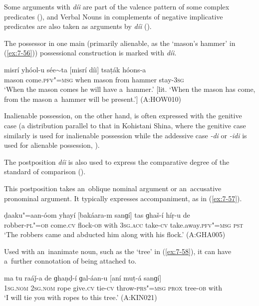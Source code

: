 Some arguments with \textit{díi} are part of the valence pattern of some complex predicates (), and Verbal Nouns in complements of negative implicative predicates are also taken as arguments by \textit{díi} ().


The possessor in one main (primarily alienable, as the `mason's hammer' in (\ref{ex:7-56})) possessional construction is marked with \textit{díi}.

\begin{exe}
\ex
\label{ex:7-56}
\gll misrí yhóol-u sée$\sim$ta [misrí díi] tsaṭák hóons-a \\
mason come.\textsc{pfv"=msg} when mason from hammer stay-\textsc{3sg} \\
\glt `When the mason comes he will have a~hammer.' [lit. `When the mason has come, from the mason a~hammer will be present.'] (A:HOW010)
\end{exe}

Inalienable possession, on the other hand, is often expressed with the genitive case (a distribution parallel to that in Kohistani Shina, where the genitive case similarly is used for inalienable possession while the addessive case \textit{-di} or \textit{-idi} is used for alienable possession, \citealt[65, 69--70]{schmidtkohistani2008}).



The postposition \textit{díi} is also used to express the comparative degree of the standard of comparison ().



 This postposition takes an~oblique nominal argument or an~accusative pronominal argument. It typically expresses accompaniment, as in (\ref{ex:7-57}).

\begin{exe}
\ex
\label{ex:7-57}
\gll ḍaaku"=aan-óom yhayí [bakáara-m sanɡí] tas ɡhaš-í híṛ-u de \\
robber-\textsc{pl"=ob} come.\textsc{cv} flock-\textsc{ob}  with \textsc{3sg.acc} take-\textsc{cv} take.away.\textsc{pfv"=msg} \textsc{pst} \\
\glt `The robbers came and abducted him along with his flock.' (A:GHA005)
\end{exe}

Used with an~inanimate noun, such as the `tree' in (\ref{ex:7-58}), it can have a~further connotation of being attached to.

\begin{exe}
\ex
\label{ex:7-58}
\gll ma tu raáǰ-a de ɡhaṇḍ-í ɡal-áan-u [aní muṭ-á sanɡí] \\
\textsc{1sg.nom} \textsc{2sg.nom} rope give.\textsc{cv} tie-\textsc{cv} throw-\textsc{prs"=msg} \textsc{prox} tree-\textsc{ob} with \\
\glt `I will tie you with ropes to this tree.' (A:KIN021)
\end{exe}


